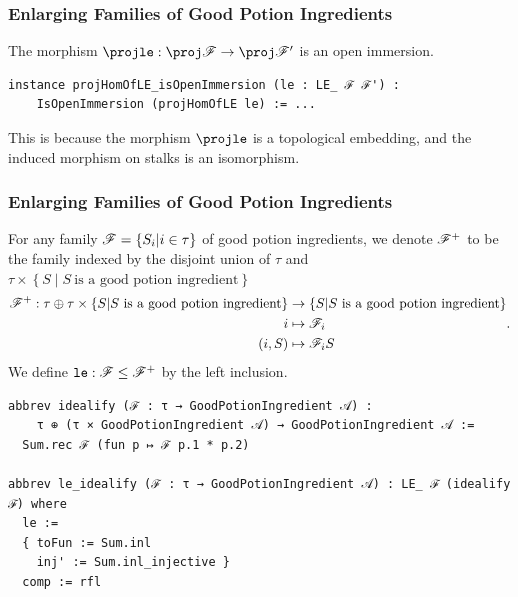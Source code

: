 \documentclass[9pt]{beamer}
\begin{document}
\begin{frame}[fragile]
\frametitle{Enlarging Families of Good Potion Ingredients}
The morphism $\proj \leanmath{le}: \proj \scrF \to \proj \scrF'$ is an open immersion.
\begin{lstlisting}[caption={$\proj\leanmath{le}$ is an open immersion}]
instance projHomOfLE_isOpenImmersion (le : LE_ ℱ ℱ') : 
    IsOpenImmersion (projHomOfLE le) := ...
\end{lstlisting}

This is because the morphism $\proj \leanmath{le}$ is a topological embedding, and the induced morphism on stalks is an isomorphism.
\end{frame}


\begin{frame}[fragile]
\frametitle{Enlarging Families of Good Potion Ingredients}
For any family $\mathscr{F} = \left\{ S_i \middle| i \in \tau \right\}$ of good potion ingredients, 
  we denote $\mathscr{F}^{+}$ to be the family indexed by the disjoint union of 
    $\tau$ and $\tau \times \left\{ S \middle| S~\text{is a good potion ingredient} \right\}$
  \[
  \begin{aligned}
    \mathscr{F}^{+} :  \tau \oplus \tau \times \left\{ S \middle| S~\text{is a good potion ingredient} \right\} &\to \left\{ S \middle| S~\text{is a good potion ingredient} \right\} \\
      i &\mapsto \mathscr{F}_i \\
      (i, S) &\mapsto \mathscr{F}_i S
  \end{aligned}.
  \]
  We define ${\footnotesize{\mathtt{le}}} : \mathscr{F} \le \mathscr{F}^{+}$ by the left inclusion.
  \begin{lstlisting}[caption={$\scrF^{+}$ and $\scrF \le \scrF^+$}, extendedchars=true]
abbrev idealify (ℱ : τ → GoodPotionIngredient 𝒜) :
    τ ⊕ (τ × GoodPotionIngredient 𝒜) → GoodPotionIngredient 𝒜 :=
  Sum.rec ℱ (fun p ↦ ℱ p.1 * p.2)

abbrev le_idealify (ℱ : τ → GoodPotionIngredient 𝒜) : LE_ ℱ (idealify ℱ) where
  le :=
  { toFun := Sum.inl
    inj' := Sum.inl_injective }
  comp := rfl
  \end{lstlisting}
\end{frame}
\end{document}
